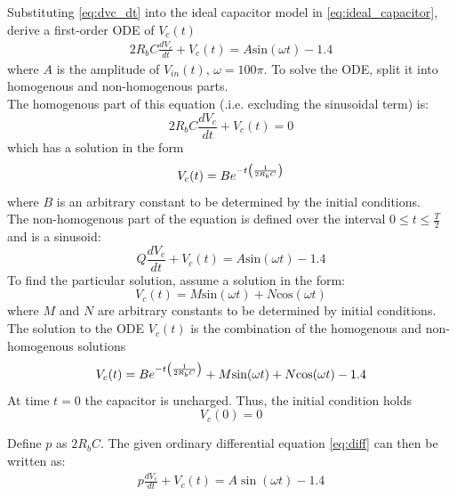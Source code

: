 Substituting \eqref{eq:dvc_dt} into the ideal capacitor model in \eqref{eq:ideal_capacitor}, derive a first-order ODE of $V_c(t)$
\begin{align}
	2R_bC\frac{dV_c}{dt} + V_c(t) = A\text{sin}(\omega t) - 1.4
	\label{eq:diff}
\end{align}
where $A$ is the amplitude of $V_{in}(t)$, $\omega = 100\pi$. To solve the ODE, split it into homogenous and non-homogenous parts. \\

The homogenous part of this equation (.i.e. excluding the sinusoidal term) is:
\begin{equation}
	2R_bC\frac{dV_c}{dt} + V_c(t) = 0
\end{equation}
which has a solution in the form
\begin{equation}
	V_c(t) = Be^{-t\left(\frac{1}{2R_bC} \right)}
\end{equation}
where $B$ is an arbitrary constant to be determined by the initial conditions. 
\\

The non-homogenous part of the equation is defined over the interval $0 \leq t \leq \frac{T}{2}$ and is a sinusoid:
\begin{equation}
	Q\frac{dV_c}{dt} + V_c(t) = A\text{sin}(\omega t) - 1.4
\end{equation}
To find the particular solution, assume a solution in the form:
\begin{equation}
	V_c(t) = M\text{sin}(\omega t) + N\text{cos}(\omega t) 
	\label{vc_t}
\end{equation}
where $M$ and $N$ are arbitrary constants to be determined by initial conditions.\\

The solution to the ODE $V_c(t)$ is the combination of the homogenous and non-homogenous solutions
\begin{equation}
	V_c(t) = Be^{-t\left(\frac{1}{2R_bC} \right)} + M\text{sin}(\omega t) + N\text{cos}(\omega t) - 1.4
\end{equation}
At time $t=0$ the capacitor is uncharged. Thus, the initial condition holds
\begin{equation}
	V_c(0) = 0
	\label{initialCondition}
\end{equation}

Define $p$ as $2R_bC$. The given ordinary differential equation \eqref{eq:diff} can then be written as:
\begin{align}
p\frac{dV_c}{dt} + V_c(t) = A\sin(\omega t) - 1.4
\end{align}

